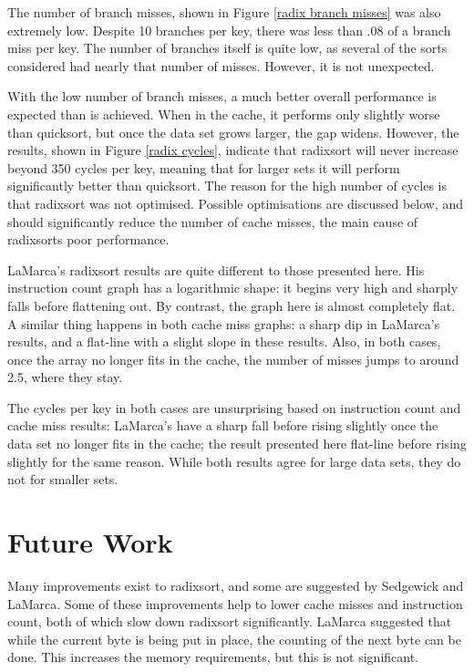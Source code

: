 The number of branch misses, shown in Figure \ref{radix branch misses} was also
extremely low. Despite 10 branches per key, there was less than .08 of a branch
miss per key. The number of branches itself is quite low, as several of the
sorts considered had nearly that number of misses. However, it is not
unexpected.

With the low number of branch misses, a much better overall performance is
expected than is achieved. When in the cache, it performs only slightly worse
than quicksort, but once the data set grows larger, the gap widens.  However,
the results, shown in Figure \ref{radix cycles}, indicate that radixsort will
never increase beyond 350 cycles per key, meaning that for larger sets it will
perform significantly better than quicksort. The reason for the high number of
cycles is that radixsort was not optimised. Possible optimisations are discussed
below, and should significantly reduce the number of cache misses, the main
cause of radixsorts poor performance.

LaMarca's radixsort results are quite different to those presented here. His
instruction count graph has a logarithmic shape: it begins very high and sharply
falls before flattening out. By contrast, the graph here is almost completely
flat. A similar thing happens in both cache miss graphs: a sharp dip in
LaMarca's results, and a flat-line with a slight slope in these results. Also,
in both cases, once the array no longer fits in the cache, the number of misses
jumps to around 2.5, where they stay. 

The cycles per key in both cases are unsurprising based on instruction count and
cache miss results: LaMarca's have a sharp fall before rising slightly once the
data set no longer fits in the cache; the result presented here flat-line before rising
slightly for the same reason. While both results agree for large data sets, they do not
for smaller sets.

\section{Future Work}
\label{radix future work}
Many improvements exist to radixsort, and some are suggested by Sedgewick and
LaMarca. Some of these improvements help to lower cache misses and instruction
count, both of which slow down radixsort significantly. LaMarca suggested
that while the current byte is being put in place, the counting of the next byte
can be done. This increases the memory requirements, but this is not
significant.

